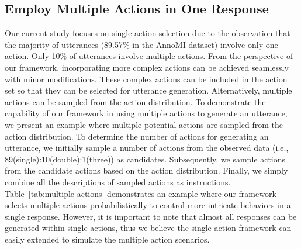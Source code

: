 \subsection{Employ Multiple Actions in One Response}

Our current study focuses on single action selection due to the observation that the majority of utterances (89.57\% in the AnnoMI dataset) involve only one action. Only 10\% of utterances involve multiple actions. From the perspective of our framework, incorporating more complex actions can be achieved seamlessly with minor modifications. These complex actions can be included in the action set so that they can be selected for utterance generation. Alternatively, multiple actions can be sampled from the action distribution. To demonstrate the capability of our framework in using multiple actions to generate an utterance, we present an example where multiple potential actions are sampled from the action distribution. To determine the number of actions for generating an utterance, we initially sample a number of actions from the observed data (i.e., 89(single):10(double):1(three)) as candidates. Subsequently, we sample actions from the candidate actions based on the action distribution. Finally, we simply combine all the descriptions of sampled actions as instructions. Table~\ref{tab:multiple actions} demonstrates an example where our framework selects multiple actions probabilistically to control more intricate behaviors in a single response. However, it is important to note that almost all responses can be generated within single actions, thus we believe the single action framework can easily extended to simulate the multiple action scenarios. 

